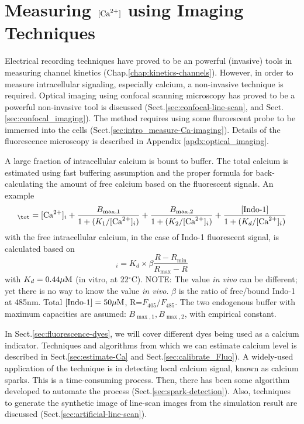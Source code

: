 \chapter{Measuring $[{\text{Ca}^{2+}}]$ using Imaging Techniques}
\label{chap:Imaging_Tech}

Electrical recording techniques have proved to be an powerful (invasive) tools
in measuring channel kinetics (Chap.\ref{chap:kinetics-channels}). However, in
order to measure intracellular signaling, especially calcium, a non-invasive
technique is required. Optical imaging using confocal scanning microscopy has
proved to be a powerful non-invasive tool is discussed
(Sect.\ref{sec:confocal-line-scan}, and Sect.\ref{sec:confocal_imaging}).  The
method requires using some fluroescent probe to be immersed into the cells
(Sect.\ref{sec:intro_measure-Ca-imaging}). Details of the fluorescence
microscopy is described in Appendix \ref{apdx:optical_imaging}.

A large fraction of intracellular calcium is bount to buffer. The total calcium
is estimated using fast buffering assumption and the proper formula for
back-calculating the amount of free calcium based on the fluorescent signals.
An example \citep{bassani1995fsr}
\begin{equation}
[\Ca]_\tot = [\Ca]_i + \frac{B_{\max,1}}{1+(K_1/[\Ca]_i)} +
\frac{B_{\max,2}}{1+(K_2/[\Ca]_i)} + \frac{[\text{Indo-1}]}{1+(K_d/[\Ca]_i)} 
\end{equation}
with the free intracellular calcium, in the case of Indo-1 fluorescent signal,
is calculated based on 
\begin{equation}
[\Ca]_i = K_d \times \beta \frac{R - R_\min}{R_\max - R}
\end{equation}
with $K_d=0.44{\mu\text{M}}$ (in vitro, at 22$^\circ$C). NOTE: The value {\it in vivo}
can be different; yet there is no way to know the value {\it in vivo}. $\beta$
is the ratio of free/bound Indo-1 at 485nm. Total
$[\text{Indo-1}]=50{\mu\text{M}}$, R=$F_{405}/F_{485}$. The two endogenous buffer with
maximum capacities are assumed: $B_{\max,1}, B_{\max,2}$, with empirical constant. 

In Sect.\ref{sec:fluorescence-dyes}, we will cover different dyes being used as
a calcium indicator. Techniques and algorithms from which we can estimate
calcium level is described in Sect.\ref{sec:estimate-Ca} and
Sect.\ref{sec:calibrate_Fluo}). A widely-used application of the technique is in
detecting local calcium signal, known as calcium sparks. This is a
time-consuming process. Then, there has been some algorithm developed to
automate the process (Sect.\ref{sec:spark-detection}). Also, techniques to
generate the synthetic image of line-scan images from the simulation result are
discussed (Sect.\ref{sec:artificial-line-scan}).

